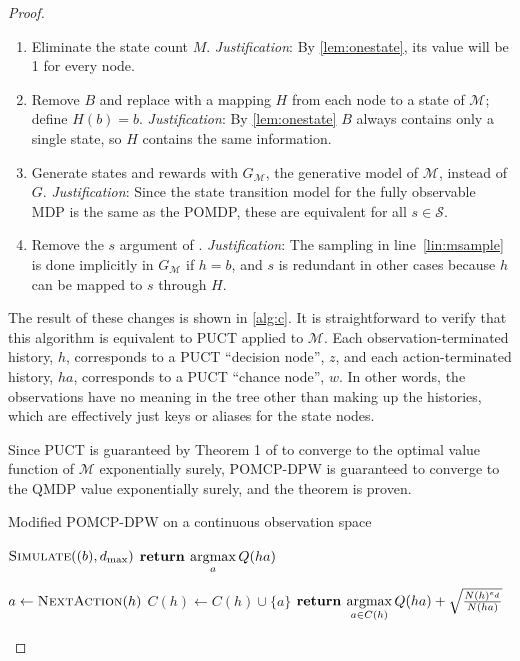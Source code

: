 \begin{proof}
    \begin{enumerate}
        \item Eliminate the state count $M$. \emph{Justification}: By \cref{lem:onestate}, its value will be 1 for every node.
        \item Remove $B$ and replace with a mapping $H$ from each node to a state of $\mathcal{M}$; define $H(b) = b$. \emph{Justification}: By \cref{lem:onestate} $B$ always contains only a single state, so $H$ contains the same information.
        \item Generate states and rewards with $G_\mathcal{M}$, the generative model of $\mathcal{M}$, instead of $G$. \emph{Justification}: Since the state transition model for the fully observable MDP is the same as the POMDP, these are equivalent for all $s \in \mathcal{S}$.
        \item Remove the $s$ argument of . \emph{Justification}: The sampling in line~\ref{lin:msample} is done implicitly in $G_\mathcal{M}$ if $h=b$, and $s$ is redundant in other cases because $h$ can be mapped to $s$ through $H$.
    \end{enumerate}

    The result of these changes is shown in \cref{alg:c}. It is straightforward to verify that this algorithm is equivalent to PUCT applied to $\mathcal{M}$.
    Each observation-terminated history, $h$, corresponds to a PUCT ``decision node'', $z$, and each action-terminated history, $ha$, corresponds to a PUCT ``chance node'', $w$.
    In other words, the observations have no meaning in the tree other than making up the histories, which are effectively just keys or aliases for the state nodes.
    
    Since PUCT is guaranteed by Theorem 1 of \citet{auger2013continuous} to converge to the optimal value function of $\mathcal{M}$ exponentially surely, POMCP-DPW is guaranteed to converge to the QMDP value exponentially surely, and the theorem is proven.

\begin{algorithm}[htb]
    \caption{Modified POMCP-DPW on a continuous observation space} \label{alg:c}
    \begin{algorithmic}[1]
                \State $\Call{Simulate}{(b), d_\text{max}}$
            \EndFor
            \State $\textbf{return } \underset{a}{\argmax}\, Q(ha)$
        \EndProcedure

                \State $a \gets \Call{NextAction}{h}$
                \State $C(h) \gets C(h) \cup \{a\}$
            \EndIf
            \State $\textbf{return } \underset{a \in C(h)}{\argmax}\, Q(ha) + \sqrt{\frac{N(h)^{e_d}}{N(ha)}}$
        \EndProcedure


\end{algorithmic}
\end{algorithm}
\end{proof}
